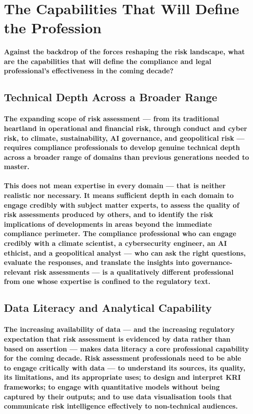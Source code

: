 \section{The Capabilities That Will Define the Profession}
\paragraph{Against the backdrop of the forces reshaping the risk landscape, what are the capabilities that will define the compliance and legal professional's effectiveness in the coming decade?}

\subsection{Technical Depth Across a Broader Range}
\paragraph{The expanding scope of risk assessment — from its traditional heartland in operational and financial risk, through conduct and cyber risk, to climate, sustainability, AI governance, and geopolitical risk — requires compliance professionals to develop genuine technical depth across a broader range of domains than previous generations needed to master.}
\paragraph{This does not mean expertise in every domain — that is neither realistic nor necessary. It means sufficient depth in each domain to engage credibly with subject matter experts, to assess the quality of risk assessments produced by others, and to identify the risk implications of developments in areas beyond the immediate compliance perimeter. The compliance professional who can engage credibly with a climate scientist, a cybersecurity engineer, an AI ethicist, and a geopolitical analyst — who can ask the right questions, evaluate the responses, and translate the insights into governance-relevant risk assessments — is a qualitatively different professional from one whose expertise is confined to the regulatory text.}

\subsection{Data Literacy and Analytical Capability}
\paragraph{The increasing availability of data — and the increasing regulatory expectation that risk assessment is evidenced by data rather than based on assertion — makes data literacy a core professional capability for the coming decade. Risk assessment professionals need to be able to engage critically with data — to understand its sources, its quality, its limitations, and its appropriate uses; to design and interpret KRI frameworks; to engage with quantitative models without being captured by their outputs; and to use data visualisation tools that communicate risk intelligence effectively to non-technical audiences.}
